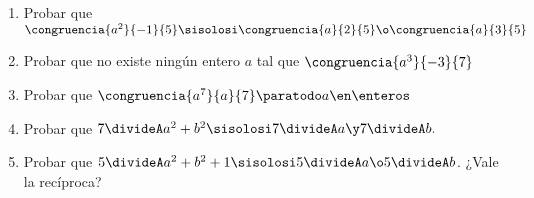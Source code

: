 \ejercicio
\begin{enumerate}[label=\roman*)]
	\item Probar que $\congruencia{a^2}{-1}{5} \sisolosi \congruencia{a}{2}{5}  \o \congruencia{a}{3}{5}$
	\item Probar que no existe ningún entero $a$ tal que $\congruencia{a^3}{-3}{7}$
	\item Probar que $\congruencia{a^7}{a}{7} \paratodo a \en \enteros$
	\item Probar que $7 \divideA a^2 + b^2 \sisolosi 7 \divideA a \y 7 \divideA b.$
	\item Probar que $5 \divideA a^2 + b^2 + 1 \sisolosi 5 \divideA a \o 5 \divideA b$. ¿Vale la recíproca?
\end{enumerate}

\separadorCorto

